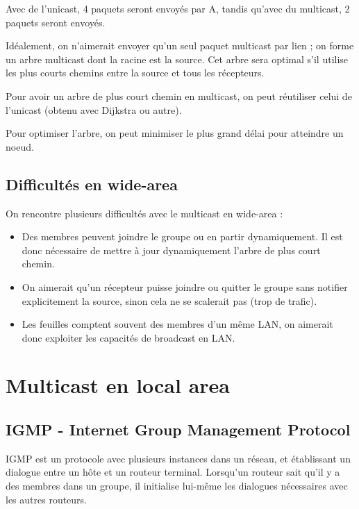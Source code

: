 		
		Avec de l'unicast, 4 paquets seront envoyés par A, tandis qu'avec du multicast, 2 paquets seront envoyés.
		
		Idéalement, on n'aimerait envoyer qu'un seul paquet multicast par lien ; on forme un arbre multicast dont la racine est la source. Cet arbre sera optimal s'il utilise les plus courts chemins entre la source et tous les récepteurs.
		
		Pour avoir un arbre de plus court chemin en multicast, on peut réutiliser celui de l'unicast (obtenu avec Dijkstra ou autre).
		
		Pour optimiser l'arbre, on peut minimiser le plus grand délai pour atteindre un noeud.
	
	
		\subsection{Difficultés en wide-area}
	
		On rencontre plusieurs difficultés avec le multicast en wide-area :
	
	\begin{itemize}
		\item Des membres peuvent joindre le groupe ou en partir dynamiquement. Il est donc nécessaire de mettre à jour dynamiquement l'arbre de plus court chemin.
		
		\item On aimerait qu'un récepteur puisse joindre ou quitter le groupe sans notifier explicitement la source, sinon cela ne se scalerait pas (trop de trafic).
		
		\item Les feuilles comptent souvent des membres d'un même LAN, on aimerait donc exploiter les capacités de broadcast en LAN.
	\end{itemize}
	
	\section{Multicast en local area}
	
		\subsection{IGMP - Internet Group Management Protocol}
		IGMP est un protocole avec plusieurs instances dans un réseau, et établissant un dialogue entre un hôte et un routeur terminal. Lorsqu'un routeur sait qu'il y a des membres dans un groupe, il initialise lui-même les dialogues nécessaires avec les autres routeurs.
		
